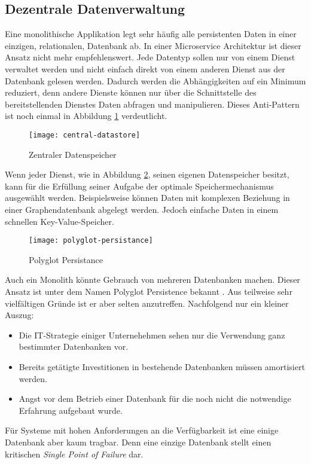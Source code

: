 \subsection{Dezentrale Datenverwaltung}

Eine monolithische Applikation legt sehr häufig alle persistenten Daten in einer einzigen, \zB relationalen, Datenbank ab. In einer Microservice Architektur ist dieser Ansatz nicht mehr empfehlenswert. Jede Datentyp sollen nur von einem Dienst verwaltet werden und nicht einfach direkt von einem anderen Dienst aus der Datenbank gelesen werden. Dadurch werden die Abhängigkeiten auf ein Minimum reduziert, denn andere Dienste können nur über die Schnittstelle des bereitstellenden Dienstes Daten abfragen und manipulieren. Dieses Anti-Pattern ist noch einmal in Abbildung \ref{fig:central-datastore} verdeutlicht.

\begin{figure}[h]
  \centering
	\texttt{[image: central-datastore]}
	\caption{Zentraler Datenspeicher}
	\label{fig:central-datastore}
\end{figure}

Wenn jeder Dienst, wie in Abbildung \ref{fig:polyglot-persistnace}, seinen eigenen Datenspeicher besitzt, kann für die Erfüllung seiner Aufgabe der optimale Speichermechanismus ausgewählt werden. Beispielsweise können Daten mit komplexen Beziehung in einer Graphendatenbank abgelegt werden. Jedoch einfache Daten in einem schnellen Key-Value-Speicher.

\begin{figure}[h]
  \centering
	\texttt{[image: polyglot-persistance]}
	\caption{Polyglot Persistance}
	\label{fig:polyglot-persistnace}
\end{figure}

Auch ein Monolith könnte Gebrauch von mehreren Datenbanken machen. Dieser Ansatz ist unter dem Namen Polyglot Persistence bekannt \cite{FowlerPP}. Aus teilweise sehr vielfältigen Gründe ist er aber selten anzutreffen. Nachfolgend nur ein kleiner Auszug:

\begin{itemize}
  \item Die IT-Strategie einiger Unternehehmen sehen nur die Verwendung ganz bestimmter Datenbanken vor.
	\item Bereits getätigte Investitionen in bestehende Datenbanken müssen amortisiert werden.
	\item Angst vor dem Betrieb einer Datenbank für die noch nicht die notwendige Erfahrung aufgebaut wurde.
\end{itemize}

Für Systeme mit hohen Anforderungen an die Verfügbarkeit ist eine einige Datenbank aber kaum tragbar. Denn eine einzige Datenbank stellt einen kritischen \textit{Single Point of Failure} dar.